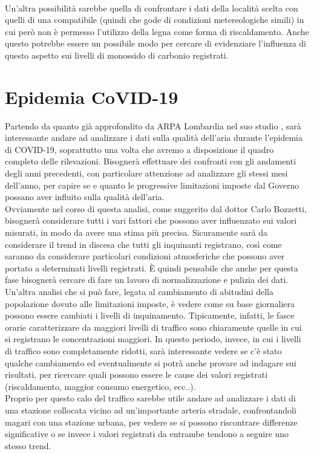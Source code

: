 \documentclass{article}
\begin{document}
\\Un'altra possibilità sarebbe quella di confrontare i dati della località scelta con quelli di una compatibile (quindi che gode di condizioni metereologiche simili) in cui però non è permesso l'utilizzo della legna come forma di riscaldamento. Anche questo potrebbe essere un possibile modo per cercare di evidenziare l'influenza di questo aspetto sui livelli di monossido di carbonio registrati.
\newpage

\section{Epidemia CoVID-19}
Partendo da quanto già approfondito da ARPA Lombardia nel suo studio \cite{arpaCovid}, sarà interessante andare ad analizzare i dati sulla qualità dell'aria durante l'epidemia di COVID-19, soprattutto una volta che avremo a disposizione il quadro completo delle rilevazioni. Bisognerà effettuare dei confronti con gli andamenti degli anni precedenti, con particolare attenzione ad analizzare gli stessi mesi dell'anno, per capire se e quanto le progressive limitazioni imposte dal Governo possano aver influito sulla qualità dell'aria.
\\Ovviamente nel corso di questa analisi, come suggerito dal dottor Carlo Bozzetti, bisognerà considerare tutti i vari fattori che possono aver influenzato sui valori misurati, in modo da avere una stima più precisa. Sicuramente sarà da considerare il trend in discesa che tutti gli inquinanti registrano, così come saranno da considerare particolari condizioni atmosferiche che possono aver portato a determinati livelli registrati. È quindi pensabile che anche per questa fase bisognerà cercare di fare un lavoro di normalizzazione e pulizia dei dati.
\\Un'altra analisi che si può fare, legata al cambiamento di abitudini della popolazione dovuto alle limitazioni imposte, è vedere come su base giornaliera possono essere cambiati i livelli di inquinamento. Tipicamente, infatti, le fasce orarie caratterizzare da maggiori livelli di traffico sono chiaramente quelle in cui si registrano le concentrazioni maggiori. In questo periodo, invece, in cui i livelli di traffico sono completamente ridotti, sarà interessante vedere se c'è stato qualche cambiamento ed eventualmente si potrà anche provare ad indagare sui risultati, per ricercare quali possono essere le cause dei valori registrati (riscaldamento, maggior consumo energetico, ecc..).
\\Proprio per questo calo del traffico sarebbe utile andare ad analizzare i dati di una stazione collocata vicino ad un'importante arteria stradale, confrontandoli magari con una stazione urbana, per vedere se si possono riscontrare differenze significative o se invece i valori registrati da entrambe tendono a seguire uno stesso trend.
\newpage
\end{document}
